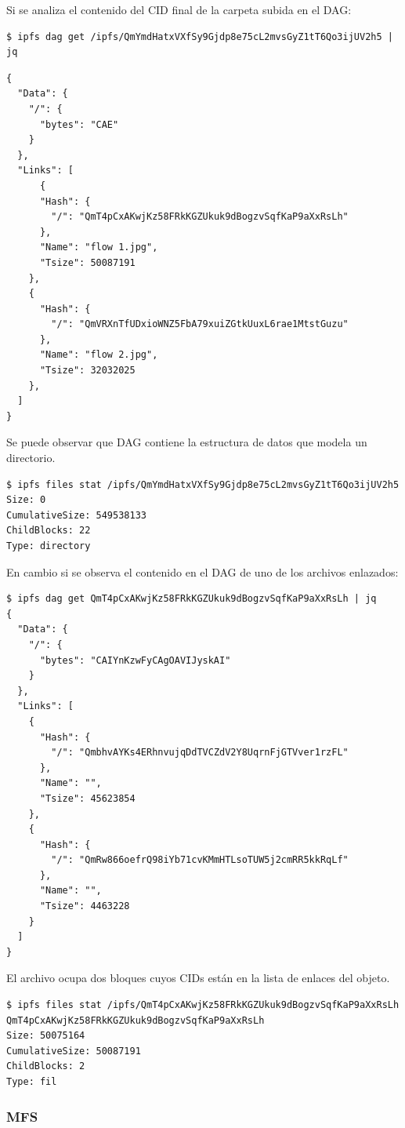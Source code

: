 Si se analiza el contenido del CID final de la carpeta subida en el DAG:

\begin{verbatim}
$ ipfs dag get /ipfs/QmYmdHatxVXfSy9Gjdp8e75cL2mvsGyZ1tT6Qo3ijUV2h5 | jq
\end{verbatim}
\begin{verbatim}
{
  "Data": {
    "/": {
      "bytes": "CAE"
    }
  },
  "Links": [
      {
      "Hash": {
        "/": "QmT4pCxAKwjKz58FRkKGZUkuk9dBogzvSqfKaP9aXxRsLh"
      },
      "Name": "flow 1.jpg",
      "Tsize": 50087191
    },
    {
      "Hash": {
        "/": "QmVRXnTfUDxioWNZ5FbA79xuiZGtkUuxL6rae1MtstGuzu"
      },
      "Name": "flow 2.jpg",
      "Tsize": 32032025
    },
  ]
}
\end{verbatim}

Se puede observar que DAG contiene la estructura de datos que modela un directorio.
\begin{verbatim}
$ ipfs files stat /ipfs/QmYmdHatxVXfSy9Gjdp8e75cL2mvsGyZ1tT6Qo3ijUV2h5
Size: 0
CumulativeSize: 549538133
ChildBlocks: 22
Type: directory
\end{verbatim}

En cambio si se observa el contenido en el DAG de uno de los archivos enlazados:
\begin{verbatim}
$ ipfs dag get QmT4pCxAKwjKz58FRkKGZUkuk9dBogzvSqfKaP9aXxRsLh | jq
{
  "Data": {
    "/": {
      "bytes": "CAIYnKzwFyCAgOAVIJyskAI"
    }
  },
  "Links": [
    {
      "Hash": {
        "/": "QmbhvAYKs4ERhnvujqDdTVCZdV2Y8UqrnFjGTVver1rzFL"
      },
      "Name": "",
      "Tsize": 45623854
    },
    {
      "Hash": {
        "/": "QmRw866oefrQ98iYb71cvKMmHTLsoTUW5j2cmRR5kkRqLf"
      },
      "Name": "",
      "Tsize": 4463228
    }
  ]
}
\end{verbatim}
El archivo ocupa dos bloques cuyos CIDs están en la lista de enlaces del objeto.
\begin{verbatim}
$ ipfs files stat /ipfs/QmT4pCxAKwjKz58FRkKGZUkuk9dBogzvSqfKaP9aXxRsLh
QmT4pCxAKwjKz58FRkKGZUkuk9dBogzvSqfKaP9aXxRsLh
Size: 50075164
CumulativeSize: 50087191
ChildBlocks: 2
Type: fil
\end{verbatim}

\subsubsection{MFS}

